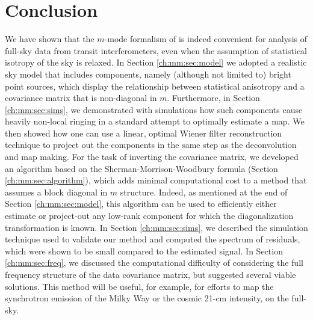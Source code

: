 \section{Conclusion}
\label{ch:mm:sec:conclusions}
We have shown that the $m$-mode formalism of \cite{mmodes1, mmodes2} is indeed convenient for analysis of full-sky data from transit interferometers, even when the assumption of statistical isotropy of the sky is relaxed. In Section \ref{ch:mm:sec:model} we adopted a realistic sky model that includes components, namely (although not limited to) bright point sources, which display the relationship between statistical anisotropy and a covariance matrix that is non-diagonal in $m$. Furthermore, in Section \ref{ch:mm:sec:sims}, we demonstrated with simulations how such components cause heavily non-local ringing in a standard attempt to optimally estimate a map. We then showed how one can use a linear, optimal Wiener filter reconstruction technique to project out the components in the same step as the deconvolution and map making. For the task of inverting the covariance matrix, we developed an algorithm based on the Sherman-Morrison-Woodbury formula (Section \ref{ch:mm:sec:algorithm}), which adds minimal computational cost to a method that assumes a block diagonal in $m$ structure. Indeed, as mentioned at the end of Section \ref{ch:mm:sec:model}, this algorithm can be used to efficiently either estimate or project-out any low-rank component for which the diagonalization transformation is known. In Section \ref{ch:mm:sec:sims}, we described the simulation technique used to validate our method and computed the spectrum of residuals, which were shown to be small compared to the estimated signal. In Section \ref{ch:mm:sec:freq}, we discussed the computational difficulty of considering the full frequency structure of the data covariance matrix, but suggested several viable solutions. This method will be useful, for example, for efforts to map the synchrotron emission of the Milky Way or the cosmic 21-cm intensity, on the full-sky.



